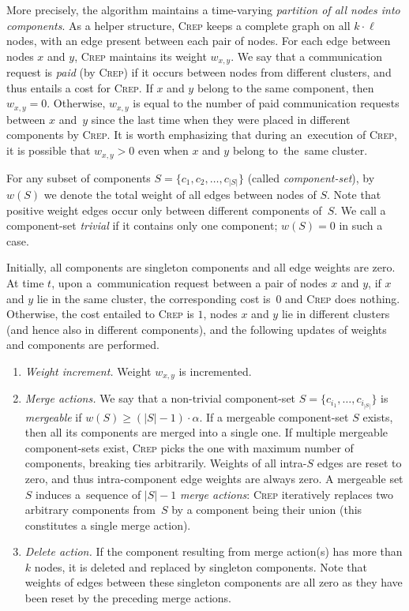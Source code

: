 \documentclass[11pt,a4paper]{scrartcl}
\newcommand{\CREP}{\textsc{Crep}\xspace}
\begin{document}
More precisely, the algorithm maintains a time-varying \emph{partition of all
nodes into components}. As a helper structure, \CREP keeps a complete graph on
all $k \cdot \ell$ nodes, with an edge present between each pair of nodes. For
each edge between nodes $x$ and $y$, \CREP maintains its weight $w_{x,y}$. We
say that a communication request is \emph{paid} (by \CREP) if it occurs
between nodes from different clusters, and thus entails a cost for \CREP. If
$x$ and $y$ belong to the same component, then $w_{x,y} = 0$. Otherwise,
$w_{x,y}$ is equal to the number of paid communication requests between $x$
and~$y$ since the last time when they were placed in different components by
\CREP. It is worth emphasizing that during an~execution of \CREP, it is
possible that $w_{x,y} > 0$ even when $x$ and $y$ belong to~the~same cluster.

For any subset of components $S = \{ c_1, c_2, \ldots, c_{|S|} \}$ (called
\emph{component-set}), by $w(S)$ we denote the total weight of all edges
between nodes of $S$. Note that positive weight edges occur only between
different components of~$S$. We call a component-set \emph{trivial} if it
contains only one component; $w(S) = 0$ in such a case.

Initially, all components are singleton components and all edge weights are
zero. At time $t$, upon a~communication request between a pair of nodes $x$
and $y$, if $x$ and $y$ lie in the same cluster, the corresponding cost is~$0$
and \CREP does nothing. Otherwise, the cost entailed to \CREP is $1$, nodes
$x$ and $y$ lie in different clusters (and hence also in different
components), and the following updates of weights and components are
performed.

\begin{enumerate}

\item \emph{Weight increment.} Weight $w_{x,y}$ is incremented.

\item \emph{Merge actions.} We say that a non-trivial component-set $S = \{
c_{i_1}, \ldots, c_{i_{|S|}} \}$ is \emph{mergeable} if $w(S) \geq
(|S|-1) \cdot \alpha$. If a mergeable component-set $S$ exists, then all its
components are merged into a single one. If multiple mergeable component-sets
exist, \CREP picks the one with maximum number of components, breaking ties
arbitrarily. Weights of all intra-$S$ edges are reset to zero, and thus
intra-component edge weights are always zero. A mergeable set $S$ induces
a~sequence of $|S|-1$ \emph{merge actions}:
\CREP iteratively replaces two arbitrary components 
from~$S$ by a component being their union (this constitutes a single merge
action).

\item \emph{Delete action.} If the component resulting from merge action(s)
has more than $k$ nodes, it is deleted and replaced by singleton
components. Note that weights of edges between these singleton components are
all zero as they have been reset by the preceding merge actions.

\end{enumerate}
\end{document}
